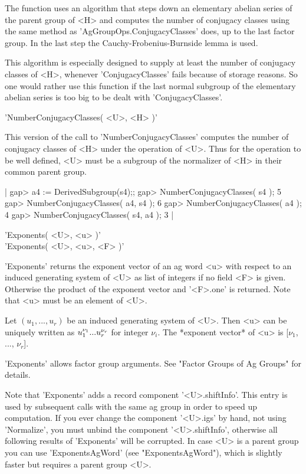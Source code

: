 The  function uses  an  algorithm that steps  down  an elementary abelian
series of the parent group  of  <H> and computes  the number of conjugacy
classes using the same method  as 'AgGroupOps.ConjugacyClasses'  does, up
to the last factor group.  In the last step the Cauchy-Frobenius-Burnside
lemma is used.

This algorithm  is  especially designed to supply at least  the number of
conjugacy classes of  <H>, whenever 'ConjugacyClasses'  fails  because of
storage reasons. So one would rather use this function if the last normal
subgroup of  the elementary abelian series  is too  big  to be dealt with
'ConjugacyClasses'.

\vspace{5mm}
'NumberConjugacyClasses( <U>, <H> )'

This version of the call to  'NumberConjugacyClasses' computes the number
of  conjugacy  classes of <H> under the operation  of <U>.  Thus for  the
operation to be well defined, <U> must be a subgroup of the normalizer of
<H> in their common parent group.

|    gap> a4 := DerivedSubgroup(s4);;
    gap> NumberConjugacyClasses( s4 );
    5
    gap> NumberConjugacyClasses( a4, s4 );
    6
    gap> NumberConjugacyClasses( a4 );
    4
    gap> NumberConjugacyClasses( s4, a4 );
    3 |


'Exponents( <U>, <u> )' \\
'Exponents( <U>, <u>, <F> )'

'Exponents' returns the exponent vector of an ag word <u> with respect to
an induced generating system of <U>  as list of integers  if no field <F>
is given.  Otherwise the product of the  exponent vector and '<F>.one' is
returned. Note that <u> must be an element of <U>.

Let $(u_1, ..., u_r)$ be an induced generating system of  <U>.  Then  <u>
can  be uniquely written as $u_1^{\nu_1}\* ...\* u_r^{\nu_r}$ for integer
$\nu_i$. The *exponent vector* of <u> is [$\nu_1$, ..., $\nu_r$].

'Exponents' allows  factor  group arguments.  See  "Factor  Groups  of Ag
Groups" for details.

Note  that 'Exponents'  adds   a record component  '<U>.shiftInfo'.  This
entry is used by  subsequent calls with  the  same ag  group in order  to
speed  up computation.  If  you ever  change the component   '<U>.igs' by
hand,    not  using   'Normalize',  you   must  unbind    the   component
'<U>.shiftInfo', otherwise  all  following results of 'Exponents' will be
corrupted.  In case <U> is a parent  group  you can use 'ExponentsAgWord'
(see "ExponentsAgWord"), which is slightly  faster but requires a  parent
group <U>.

